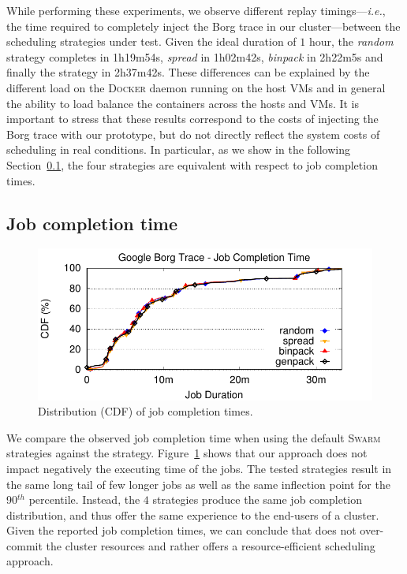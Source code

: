 While performing these experiments, we observe different replay timings---\emph{i.e.}, the time required to completely inject the Borg trace in our cluster---between the scheduling strategies under test.
Given the ideal duration of $1$ hour, the \emph{random} strategy completes in 1h19m54s, \emph{spread} in 1h02m42s, \emph{binpack} in 2h22m5s and finally the \GP strategy in 2h37m42s.
These differences can be explained by the different load on the \textsc{Docker} daemon running on the host VMs and in general the ability to load balance the containers across the hosts and VMs.
It is important to stress that these results correspond to the costs of injecting the Borg trace with our prototype, but do not directly reflect the system costs of scheduling in real conditions.
In particular, as we show in the following Section~\ref{subsec:eval:compl}, the four strategies are equivalent with respect to job completion times.


\subsection{Job completion time}
\label{subsec:eval:compl}

\begin{figure}[t!]
  \centering
  \includegraphics[]{Figures/plots/completion/completion}
  \caption{Distribution (CDF) of job completion times.}
  \label{fig:completion}
\end{figure}

We compare the observed job completion time when using the default \textsc{Swarm} strategies against the \GP strategy.
Figure~\ref{fig:completion} shows that our approach does not impact negatively the executing time of the jobs.
The tested strategies result in the same long tail of few longer jobs as well as the same inflection point for the 90$^{th}$ percentile.
Instead, the $4$ strategies produce the same job completion distribution, and thus offer the same experience to the end-users of a \GP cluster.
Given the reported job completion times, we can conclude that \GP does not over-commit the cluster resources and rather offers a resource-efficient scheduling approach.

